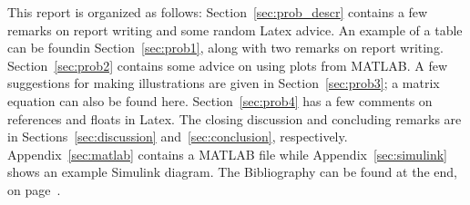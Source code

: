 This report is organized as follows: Section~\ref{sec:prob_descr} contains a few remarks on report writing and some random Latex advice. An example of a table can be foundin Section~\ref{sec:prob1}, along with two remarks on report writing. Section~\ref{sec:prob2} contains some advice on using plots from MATLAB. A few suggestions for making illustrations are given in Section~\ref{sec:prob3}; a matrix equation can also be found here. Section~\ref{sec:prob4} has a few comments on references and floats in Latex. The closing discussion and concluding remarks are in Sections~\ref{sec:discussion} and~\ref{sec:conclusion}, respectively. Appendix~\ref{sec:matlab} contains a MATLAB file while Appendix~\ref{sec:simulink} shows an example Simulink diagram. The Bibliography can be found at the end, on page~\pageref{sec:bibliography}.
